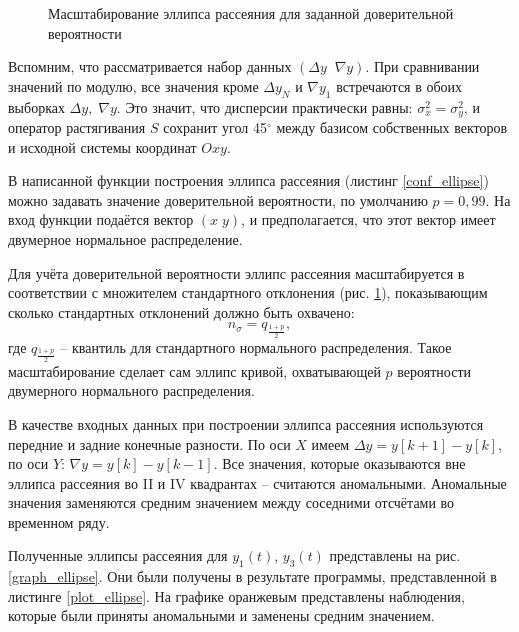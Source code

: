 \begin{figure}
	\centering
	
	\caption{Масштабирование эллипса рассеяния для заданной доверительной вероятности}
	\label{ellipse_ill}
\end{figure}


Вспомним, что рассматривается набор данных $\left( \Delta y\;\;\nabla y \right)$. При сравнивании значений по модулю, все значения кроме $\Delta y_N$ и $\nabla y_1$ встречаются в обоих выборках $\Delta y,\;\nabla y$. Это значит, что дисперсии практически равны: $\sigma^2_x = \sigma^2_y$, и оператор растягивания $S$ сохранит угол 45$^\circ$ между базисом собственных векторов и исходной системы координат $Oxy$.

В написанной функции построения эллипса рассеяния (листинг \ref{conf_ellipse}) можно задавать значение доверительной вероятности, по умолчанию $p=0,99$. На вход функции подаётся вектор $(x\;y)$, и предполагается, что этот вектор имеет двумерное нормальное распределение. 

Для учёта доверительной вероятности эллипс рассеяния масштабируется в соответствии с множителем стандартного отклонения (рис. \ref{ellipse_ill}), показывающим сколько стандартных отклонений должно быть охвачено:
\begin{equation*}
	n_\sigma = q_{\frac{1+p}{2}},
\end{equation*}
где $q_{\frac{1+p}{2}}$ -- квантиль для стандартного нормального распределения. Такое масштабирование сделает сам эллипс кривой, охватывающей $p$ вероятности двумерного нормального распределения.

В качестве входных данных при построении эллипса рассеяния используются передние и задние конечные разности. По оси $X$ имеем $\Delta y = y[k+1] - y[k]$, по оси $Y$: $\nabla y = y[k] - y[k-1]$. Все значения, которые оказываются вне эллипса рассеяния во II и IV квадрантах -- считаются аномальными. Аномальные значения заменяются средним значением между соседними отсчётами во временном ряду.

Полученные эллипсы рассеяния для $y_1(t)$, $y_3(t)$ представлены на рис. \ref{graph_ellipse}. Они были получены в результате программы, представленной в листинге \ref{plot_ellipse}. На графике оранжевым представлены наблюдения, которые были приняты аномальными и заменены средним значением.



